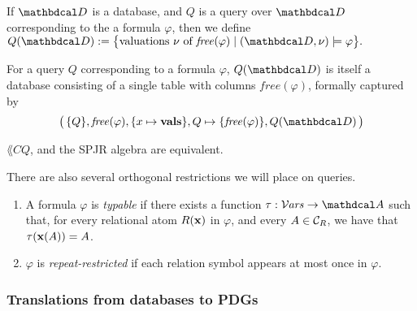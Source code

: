 \documentclass[the-pdg-manual.tex]{subfiles}
\begin{document}
\begin{defn}
	If $\D$ is a database, and $Q$ is a query over $\D$ corresponding to the a formula $\varphi$, then we define
	$ Q(\D) := \big\{ \text{valuations $\nu$ of $\mathit{free}(\varphi)$} \mid (\D,\nu) \models \varphi \big\}.$
\end{defn}

\begin{remark}
	For a query $Q$ corresponding to a formula $\varphi$, $Q(\D)$ is itself a database consisting of a single table with columns $\mathit{free}(\varphi)$, formally captured by
	\[ \big(\,\{Q\}, \mathit{free}(\varphi), \{x \mapsto \mathbf{vals}\}, Q\mapsto \{\mathit{free}(\varphi)\}, Q(\D)\,\big) \]
\end{remark}

\begin{fact}
    $\lang{CQ}$, and the SPJR algebra are equivalent.
\end{fact}
%

There are also several orthogonal restrictions we will place on queries.
\begin{enumerate}
\item A formula $\varphi$ is \emph{typable} if there exists a function $\tau: \Varis \to \Attrs$ such that, for every relational atom $R(\mathbf x)$ in $\varphi$, and every $A \in \mathcal C_R$, we have that $\tau(\mathbf x(A)) = A$.

\item $\varphi$ is \emph{repeat-restricted} if each relation symbol appears at most once in $\varphi$.
\end{enumerate}


\subsubsection{Translations from databases to PDGs}

\end{document}
